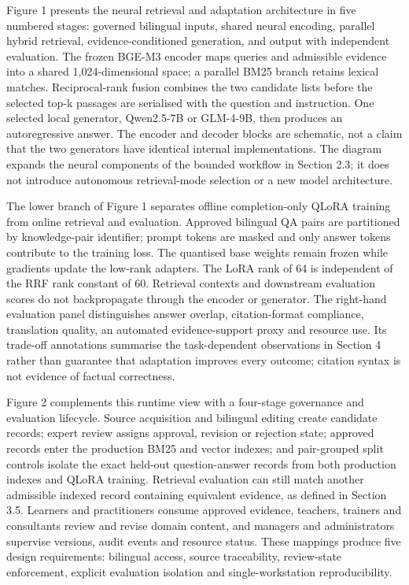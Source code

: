 Figure 1 presents the neural retrieval and adaptation architecture in five numbered stages: governed bilingual inputs, shared neural encoding, parallel hybrid retrieval, evidence-conditioned generation, and output with independent evaluation. The frozen BGE-M3 encoder maps queries and admissible evidence into a shared 1,024-dimensional space; a parallel BM25 branch retains lexical matches. Reciprocal-rank fusion combines the two candidate lists before the selected top-k passages are serialised with the question and instruction. One selected local generator, Qwen2.5-7B or GLM-4-9B, then produces an autoregressive answer. The encoder and decoder blocks are schematic, not a claim that the two generators have identical internal implementations. The diagram expands the neural components of the bounded workflow in Section 2.3; it does not introduce autonomous retrieval-mode selection or a new model architecture.

The lower branch of Figure 1 separates offline completion-only QLoRA training from online retrieval and evaluation. Approved bilingual QA pairs are partitioned by knowledge-pair identifier; prompt tokens are masked and only answer tokens contribute to the training loss. The quantised base weights remain frozen while gradients update the low-rank adapters. The LoRA rank of 64 is independent of the RRF rank constant of 60. Retrieval contexts and downstream evaluation scores do not backpropagate through the encoder or generator. The right-hand evaluation panel distinguishes answer overlap, citation-format compliance, translation quality, an automated evidence-support proxy and resource use. Its trade-off annotations summarise the task-dependent observations in Section 4 rather than guarantee that adaptation improves every outcome; citation syntax is not evidence of factual correctness.

Figure 2 complements this runtime view with a four-stage governance and evaluation lifecycle. Source acquisition and bilingual editing create candidate records; expert review assigns approval, revision or rejection state; approved records enter the production BM25 and vector indexes; and pair-grouped split controls isolate the exact held-out question-answer records from both production indexes and QLoRA training. Retrieval evaluation can still match another admissible indexed record containing equivalent evidence, as defined in Section 3.5. Learners and practitioners consume approved evidence, teachers, trainers and consultants review and revise domain content, and managers and administrators supervise versions, audit events and resource status. These mappings produce five design requirements: bilingual access, source traceability, review-state enforcement, explicit evaluation isolation and single-workstation reproducibility.

